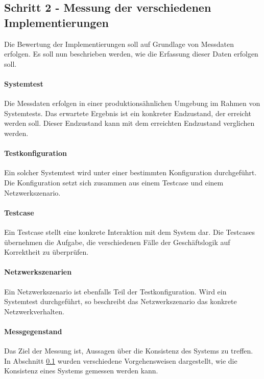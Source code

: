 \subsection{Schritt 2 - Messung der verschiedenen Implementierungen}

Die Bewertung der Implementierungen soll auf Grundlage von Messdaten erfolgen. Es soll nun beschrieben werden, wie die Erfassung dieser Daten erfolgen soll.


\paragraph*{Systemtest}
Die Messdaten erfolgen in einer produktionsähnlichen Umgebung im Rahmen von Systemtests. Das erwartete Ergebnis ist ein konkreter Endzustand, der erreicht werden soll. Dieser Endzustand kann mit dem erreichten Endzustand verglichen werden.

\paragraph*{Testkonfiguration}
Ein solcher Systemtest wird unter einer bestimmten Konfiguration durchgeführt. Die Konfiguration setzt sich zusammen aus einem Testcase und einem Netzwerkszenario. 

\paragraph*{Testcase}
Ein Testcase stellt eine konkrete Interaktion mit dem System dar. Die Testcases übernehmen die Aufgabe, die verschiedenen Fälle der Geschäftslogik auf Korrektheit zu überprüfen.

\paragraph*{Netzwerkszenarien}
Ein Netzwerkszenario ist ebenfalls Teil der Testkonfiguration. Wird ein Systemtest durchgeführt, so beschreibt das Netzwerkszenario das konkrete Netzwerkverhalten.

\paragraph*{Messgegenstand}
Das Ziel der Messung ist, Aussagen über die Konsistenz des Systems zu treffen. In Abschnitt \ref{} wurden verschiedene Vorgehensweisen dargestellt, wie die Konsistenz eines Systems gemessen werden kann. 

